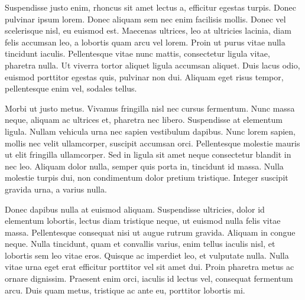 Suspendisse justo enim, rhoncus sit amet lectus a, efficitur egestas turpis. Donec pulvinar ipsum lorem. Donec aliquam sem nec enim facilisis mollis. Donec vel scelerisque nisl, eu euismod est. Maecenas ultrices, leo at ultricies lacinia, diam felis accumsan leo, a lobortis quam arcu vel lorem. Proin ut purus vitae nulla tincidunt iaculis. Pellentesque vitae nunc mattis, consectetur ligula vitae, pharetra nulla. Ut viverra tortor aliquet ligula accumsan aliquet. Duis lacus odio, euismod porttitor egestas quis, pulvinar non dui. Aliquam eget risus tempor, pellentesque enim vel, sodales tellus.

Morbi ut justo metus. Vivamus fringilla nisl nec cursus fermentum. Nunc massa neque, aliquam ac ultrices et, pharetra nec libero. Suspendisse at elementum ligula. Nullam vehicula urna nec sapien vestibulum dapibus. Nunc lorem sapien, mollis nec velit ullamcorper, suscipit accumsan orci. Pellentesque molestie mauris ut elit fringilla ullamcorper. Sed in ligula sit amet neque consectetur blandit in nec leo. Aliquam dolor nulla, semper quis porta in, tincidunt id massa. Nulla molestie turpis dui, non condimentum dolor pretium tristique. Integer suscipit gravida urna, a varius nulla.

Donec dapibus nulla at euismod aliquam. Suspendisse ultricies, dolor id elementum lobortis, lectus diam tristique neque, ut euismod nulla felis vitae massa. Pellentesque consequat nisi ut augue rutrum gravida. Aliquam in congue neque. Nulla tincidunt, quam et convallis varius, enim tellus iaculis nisl, et lobortis sem leo vitae eros. Quisque ac imperdiet leo, et vulputate nulla. Nulla vitae urna eget erat efficitur porttitor vel sit amet dui. Proin pharetra metus ac ornare dignissim. Praesent enim orci, iaculis id lectus vel, consequat fermentum arcu. Duis quam metus, tristique ac ante eu, porttitor lobortis mi.

